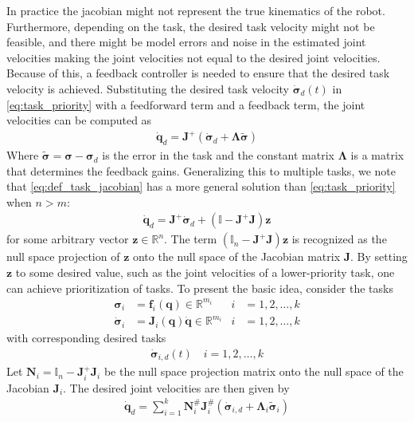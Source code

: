 In practice the jacobian might not represent the true kinematics of the robot.
Furthermore, depending on the task, the desired task velocity might not be feasible,
and there might be model errors and noise in the estimated joint velocities making
the joint velocities not equal to the desired joint velocities. Because of this,
a feedback controller is needed to ensure that the desired task velocity is
achieved. Substituting the desired task velocity $\dot{\bm{\sigma}}_d(t)$ in 
\autoref{eq:task_priority} with
a feedforward term and a feedback term, the joint velocities can be computed as
\begin{align}
    \dot{\bm{q}}_d = \bm{J}^{+} \left(\dot{\bm{\sigma}}_d + \bm{\Lambda}\tilde{\bm{\sigma}}\right)
\end{align}
Where $\tilde{\bm{\sigma}} = \bm{\sigma} - \bm{\sigma}_d$ is the error in the
task and the constant matrix $\bm{\Lambda}$ is a matrix that determines the
feedback gains.
Generalizing this to multiple tasks, we note that \autoref{eq:def_task_jacobian}
has a more general solution than \autoref{eq:task_priority} when $n > m$:
\begin{align}
    \dot{\bm{q}}_d = \bm{J}^{+} \dot{\bm{\sigma}}_d + (\mathbb{I} - \bm{J}^{+} \bm{J}) \bm{z}
\end{align}
for some arbitrary vector $\bm{z} \in \mathbb{R}^n$. The term
$(\mathbb{I}_n - \bm{J}^{+} \bm{J}) \bm{z}$ is recognized as the null space projection
of $\bm{z}$ onto the null space of the Jacobian matrix $\bm{J}$. By setting
$\bm{z}$ to some desired value, such as the joint velocities of a lower-priority task,
one can achieve prioritization of tasks. To present the basic idea, consider the
tasks
\begin{subequations}
\begin{align}
    \bm{\sigma}_i &= \bm{f}_i(\bm{q}) \in \mathbb{R}^{m_i} &i &= 1, 2, \ldots, k \\
    \dot{\bm{\sigma}}_i &= \bm{J}_i(\bm{q}) \dot{\bm{q}} \in \mathbb{R}^{m_i} &i &= 1, 2, \ldots, k
\end{align}
\end{subequations}
with corresponding desired tasks
\begin{align}
    \dot{\bm{\sigma}}_{i,d}(t) \quad i = 1, 2, \ldots, k
\end{align}
Let $\bm{N}_i = \mathbb{I}_n - \bm{J}_i^{+} \bm{J}_i$ be the null space projection
matrix onto the null space of the Jacobian $\bm{J}_i$.
The desired joint velocities are then given by
\begin{align}
    \dot{\bm{q}}_d = \sum_{i=1}^k \bm{N}_i^{\#}\bm{J}_i^{\#} \left(\dot{\bm{\sigma}}_{i,d} + \bm{\Lambda}_i \tilde{\bm{\sigma}}_i\right) \label{eq:task_priority_vel}
\end{align}

